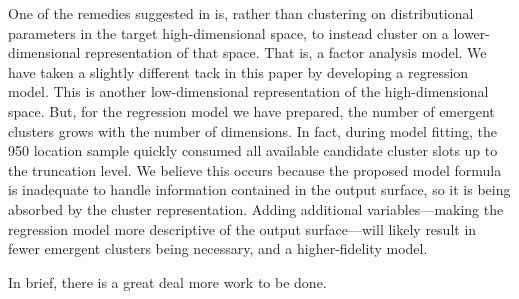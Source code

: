 One of the remedies suggested in \cite{chandra2023} is, rather than clustering on distributional 
    parameters in the target high-dimensional space, to instead cluster on a lower-dimensional 
    representation of that space.  That is, a factor analysis model.  We have taken a slightly
    different tack in this paper by developing a regression model.  This is another low-dimensional
    representation of the high-dimensional space.  But, for the regression model we have prepared, 
    the number of emergent clusters grows with the number of dimensions.  In fact, during model fitting,
    the \num{950} location sample quickly consumed all available candidate cluster slots up to the
    truncation level. We believe this occurs because the proposed model formula is inadequate to handle
    information contained in the output surface, so it is being absorbed by the cluster representation.
    Adding additional variables---making the regression model more descriptive of the output 
    surface---will likely result in fewer emergent clusters being necessary, and a higher-fidelity model.

In brief, there is a great deal more work to be done.

